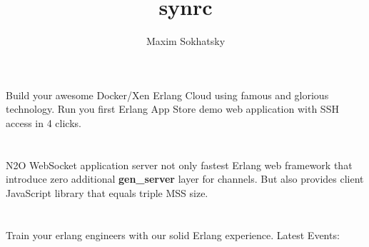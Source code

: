 \documentclass[11pt]{article}
\begin{document}
\title{synrc}
\author{Maxim Sokhatsky}
\section*{}
\paragraph{}
Build your awesome Docker/Xen Erlang Cloud using
famous  and
glorious  technology.
Run you first Erlang App Store demo web application with SSH access in 4 clicks.

\section*{}
\paragraph{}
N2O WebSocket application server not only fastest Erlang web
framework that introduce zero additional {\bf gen_server} layer for channels.
But also provides client JavaScript library that equals triple MSS size.

\section*{}
\paragraph{}
Train your erlang engineers with our solid Erlang experience.
Latest Events:
\paragraph{}
\paragraph{}
\end{document}
